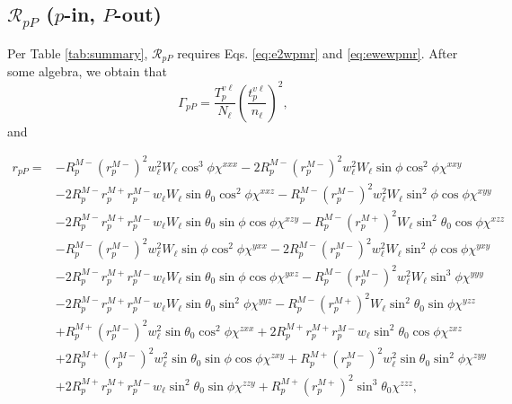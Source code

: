\documentclass[aps,prb,10pt,showpacs,letterpaper,twocolumn]{revtex4-1}
\begin{document}
\subsection{\texorpdfstring{$\mathcal{R}_{pP}$ ($p$-in, $P$-out)}
{RpP (p-in, P-out)}}
\label{sec:RpP} 

Per Table \ref{tab:summary}, $\mathcal{R}_{pP}$ requires Eqs. \eqref{eq:e2wpmr}
and \eqref{eq:ewewpmr}. After some algebra, we obtain that
\begin{equation}\label{eq:mc78}
\Gamma_{pP} =
\frac{T^{v\ell}_{p}}{N_{\ell}}
\left(\frac{t^{v\ell}_{p}}{n_{\ell}}\right)^{2}
,
\end{equation}
and
\begin{widetext}
\begin{equation}
\begin{split}
r_{pP} =
&-R^{M-}_{p}\left(r^{M-}_{p}\right)^{2}w^{2}_{\ell}W_{\ell}\cos^{3}\phi
\chi^{xxx}
 -2R^{M-}_{p}\left(r^{M-}_{p}\right)^{2}w^{2}_{\ell}W_{\ell}\sin\phi\cos^{2}\phi
\chi^{xxy}\\
&-2R^{M-}_{p}r^{M+}_{p}r^{M-}_{p}w_{\ell}W_{\ell}\sin\theta_{0}\cos^{2}\phi
\chi^{xxz}
 -R^{M-}_{p}\left(r^{M-}_{p}\right)^{2}w^{2}_{\ell}W_{\ell}\sin^{2}\phi\cos\phi
\chi^{xyy}\\
&-2R^{M-}_{p}r^{M+}_{p}r^{M-}_{p}w_{\ell}W_{\ell}\sin\theta_{0}\sin\phi\cos\phi
\chi^{xzy}
 -R^{M-}_{p}\left(r^{M+}_{p}\right)^{2}W_{\ell}\sin^{2}\theta_{0}\cos\phi
\chi^{xzz}\\
&-R^{M-}_{p}\left(r^{M-}_{p}\right)^{2}w^{2}_{\ell}W_{\ell}\sin\phi\cos^{2}\phi
\chi^{yxx}
 -2R^{M-}_{p}\left(r^{M-}_{p}\right)^{2}w^{2}_{\ell}W_{\ell}\sin^{2}\phi\cos\phi
\chi^{yxy}\\
&-2R^{M-}_{p}r^{M+}_{p}r^{M-}_{p}w_{\ell}W_{\ell}\sin\theta_{0}\sin\phi\cos\phi
\chi^{yxz}
 -R^{M-}_{p}\left(r^{M-}_{p}\right)^{2}w^{2}_{\ell}W_{\ell}\sin^{3}\phi
\chi^{yyy}\\
&-2R^{M-}_{p}r^{M+}_{p}r^{M-}_{p}w_{\ell}W_{\ell}\sin\theta_{0}\sin^{2}\phi
\chi^{yyz}
 -R^{M-}_{p}\left(r^{M+}_{p}\right)^{2}W_{\ell}\sin^{2}\theta_{0}\sin\phi
\chi^{yzz}\\
&+R^{M+}_{p}\left(r^{M-}_{p}\right)^{2}w^{2}_{\ell}\sin\theta_{0}\cos^{2}\phi
\chi^{zxx}
 +2R^{M+}_{p}r^{M+}_{p}r^{M-}_{p}w_{\ell}\sin^{2}\theta_{0}\cos\phi
\chi^{zxz}\\
&+2R^{M+}_{p}\left(r^{M-}_{p}\right)^{2}w^{2}_{\ell}\sin\theta_{0}\sin\phi
\cos\phi\chi^{zxy}
 +R^{M+}_{p}\left(r^{M-}_{p}\right)^{2}w^{2}_{\ell}\sin\theta_{0}\sin^{2}\phi
\chi^{zyy}\\
&+2R^{M+}_{p}r^{M+}_{p}r^{M-}_{p}w_{\ell}\sin^{2}\theta_{0}\sin\phi
\chi^{zzy}
 +R^{M+}_{p}\left(r^{M+}_{p}\right)^{2}\sin^{3}\theta_{0}
\chi^{zzz},
\end{split}
\end{equation}
\end{widetext}
\end{document}
